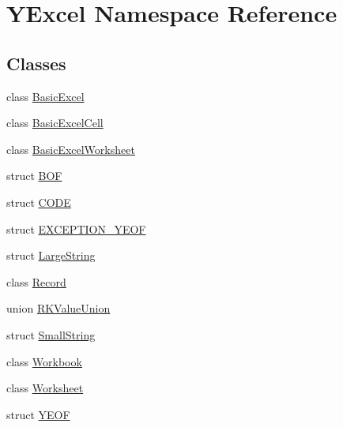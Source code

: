 \hypertarget{namespace_y_excel}{}\section{Y\+Excel Namespace Reference}
\label{namespace_y_excel}
\subsection*{Classes}
\begin{DoxyCompactItemize}
\item 
class \hyperlink{class_y_excel_1_1_basic_excel}{Basic\+Excel}
\item 
class \hyperlink{class_y_excel_1_1_basic_excel_cell}{Basic\+Excel\+Cell}
\item 
class \hyperlink{class_y_excel_1_1_basic_excel_worksheet}{Basic\+Excel\+Worksheet}
\item 
struct \hyperlink{struct_y_excel_1_1_b_o_f}{B\+O\+F}
\item 
struct \hyperlink{struct_y_excel_1_1_c_o_d_e}{C\+O\+D\+E}
\item 
struct \hyperlink{struct_y_excel_1_1_e_x_c_e_p_t_i_o_n___y_e_o_f}{E\+X\+C\+E\+P\+T\+I\+O\+N\+\_\+\+Y\+E\+O\+F}
\item 
struct \hyperlink{struct_y_excel_1_1_large_string}{Large\+String}
\item 
class \hyperlink{class_y_excel_1_1_record}{Record}
\item 
union \hyperlink{union_y_excel_1_1_r_k_value_union}{R\+K\+Value\+Union}
\item 
struct \hyperlink{struct_y_excel_1_1_small_string}{Small\+String}
\item 
class \hyperlink{class_y_excel_1_1_workbook}{Workbook}
\item 
class \hyperlink{class_y_excel_1_1_worksheet}{Worksheet}
\item 
struct \hyperlink{struct_y_excel_1_1_y_e_o_f}{Y\+E\+O\+F}
\end{DoxyCompactItemize}
